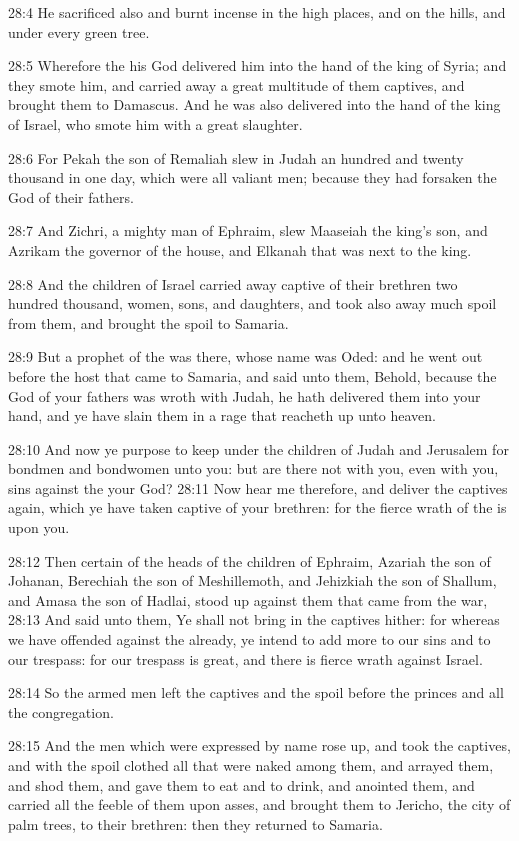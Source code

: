 28:4 He sacrificed also and burnt incense in the high places, and on
the hills, and under every green tree.

28:5 Wherefore the \LORD his God delivered him into the hand of the
king of Syria; and they smote him, and carried away a great multitude
of them captives, and brought them to Damascus. And he was also
delivered into the hand of the king of Israel, who smote him with a
great slaughter.

28:6 For Pekah the son of Remaliah slew in Judah an hundred and twenty
thousand in one day, which were all valiant men; because they had
forsaken the \LORD God of their fathers.

28:7 And Zichri, a mighty man of Ephraim, slew Maaseiah the king's
son, and Azrikam the governor of the house, and Elkanah that was next
to the king.

28:8 And the children of Israel carried away captive of their brethren
two hundred thousand, women, sons, and daughters, and took also away
much spoil from them, and brought the spoil to Samaria.

28:9 But a prophet of the \LORD was there, whose name was Oded: and he
went out before the host that came to Samaria, and said unto them,
Behold, because the \LORD God of your fathers was wroth with Judah, he
hath delivered them into your hand, and ye have slain them in a rage
that reacheth up unto heaven.

28:10 And now ye purpose to keep under the children of Judah and
Jerusalem for bondmen and bondwomen unto you: but are there not with
you, even with you, sins against the \LORD your God?  28:11 Now hear me
therefore, and deliver the captives again, which ye have taken captive
of your brethren: for the fierce wrath of the \LORD is upon you.

28:12 Then certain of the heads of the children of Ephraim, Azariah
the son of Johanan, Berechiah the son of Meshillemoth, and Jehizkiah
the son of Shallum, and Amasa the son of Hadlai, stood up against them
that came from the war, 28:13 And said unto them, Ye shall not bring
in the captives hither: for whereas we have offended against the \LORD
already, ye intend to add more to our sins and to our trespass: for
our trespass is great, and there is fierce wrath against Israel.

28:14 So the armed men left the captives and the spoil before the
princes and all the congregation.

28:15 And the men which were expressed by name rose up, and took the
captives, and with the spoil clothed all that were naked among them,
and arrayed them, and shod them, and gave them to eat and to drink,
and anointed them, and carried all the feeble of them upon asses, and
brought them to Jericho, the city of palm trees, to their brethren:
then they returned to Samaria.

